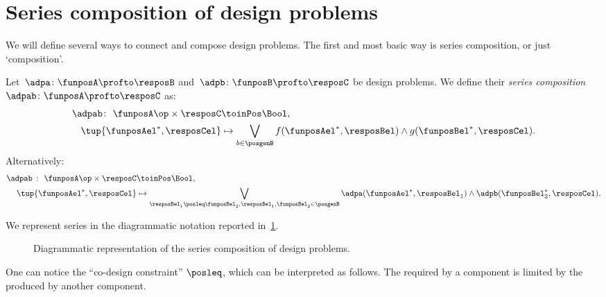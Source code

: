 \section{Series composition of design problems}
We will define several ways to connect and compose design problems. The first and most basic way is series composition, or just `composition'.

\begin{definition}
  \label{def:dp-series}
  Let~$\adpa \colon  \funposA \profto \resposB$ and~$\adpb \colon \funposB \profto \resposC$ be design problems. We define their \emph{series composition}~$\adpab \colon  \funposA \profto \resposC$ as:
  \begin{equation}
    \label{eq:composition2}
    \begin{aligned}
    \adpab
      \colon \ \funposA\op \times \resposC & \toinPos  \Bool, \\
      \tup{\funposAel^*, \resposCel} &\mapsto \bigvee_{b\in \posgenB} f(\funposAel^*,\resposBel) \wedge g(\funposBel^*,\resposCel).
    \end{aligned}
  \end{equation}
  Alternatively:
  \begin{equation}
    \begin{aligned}
      \label{eq:composition}
      \adpab\  \colon \ \funposA\op \times \resposC & \toinPos  \Bool,  \\
      \tup{\funposAel^*, \resposCel} &\mapsto \bigvee_{\resposBel_1\posleq\funposBel_2, \resposBel_1,\funposBel_2\in \posgenB} \adpa(\funposAel^*,\resposBel_1) \wedge \adpb(\funposBel_2^*,\resposCel).
    \end{aligned}
  \end{equation}
\end{definition}
We represent series in the diagrammatic notation reported in~\cref{fig:compositiondiagram}.

\begin{figure}[h!]
  \begin{center}
  \end{center}
  \caption{Diagrammatic representation of the series composition of design problems. \label{fig:compositiondiagram}}
\end{figure}

One can notice the ``co-design constraint'' $\posleq$, which can be interpreted as follows.
The  required by a component is limited by the  produced by another component.

